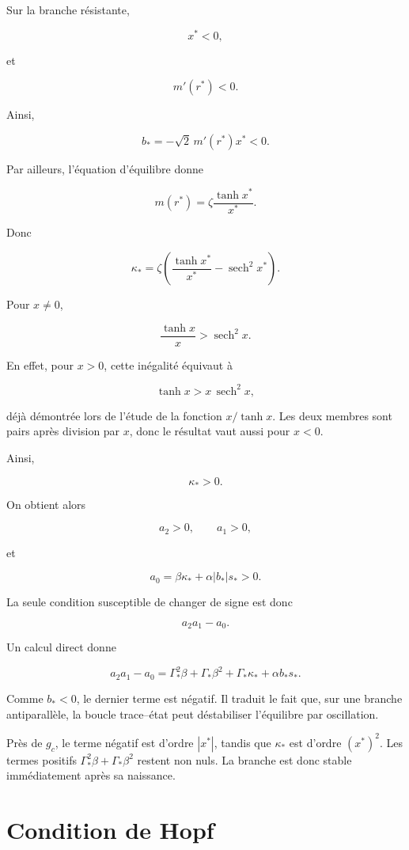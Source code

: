 Sur la branche résistante,

\[
x^\ast<0,
\]

et

\[
m'(r^\ast)<0.
\]

Ainsi,

\[
b_\ast
=
-\sqrt2\,m'(r^\ast)x^\ast
<0.
\]

Par ailleurs, l'équation d'équilibre donne

\[
m(r^\ast)
=
\zeta\frac{\tanh x^\ast}{x^\ast}.
\]

Donc

\[
\kappa_\ast
=
\zeta
\left(
\frac{\tanh x^\ast}{x^\ast}
-
\operatorname{sech}^2x^\ast
\right).
\]

Pour \(x\neq0\),

\[
\frac{\tanh x}{x}
>
\operatorname{sech}^2x.
\]

En effet, pour \(x>0\), cette inégalité équivaut à

\[
\tanh x
>
x\,\operatorname{sech}^2x,
\]

déjà démontrée lors de l'étude de la fonction
\(x/\tanh x\). Les deux membres sont pairs après division par \(x\),
donc le résultat vaut aussi pour \(x<0\).

Ainsi,

\[
\kappa_\ast>0.
\]

On obtient alors

\[
a_2>0,
\qquad
a_1>0,
\]

et

\[
a_0
=
\beta\kappa_\ast
+
\alpha|b_\ast|s_\ast
>0.
\]

La seule condition susceptible de changer de signe est donc

\[
a_2a_1-a_0.
\]

Un calcul direct donne

\[
\boxed{
a_2a_1-a_0
=
\Gamma_\ast^2\beta
+
\Gamma_\ast\beta^2
+
\Gamma_\ast\kappa_\ast
+
\alpha b_\ast s_\ast.
}
\]

Comme \(b_\ast<0\), le dernier terme est négatif. Il traduit le fait
que, sur une branche antiparallèle, la boucle
trace--état peut déstabiliser l'équilibre par oscillation.

Près de \(g_c\), le terme négatif est d'ordre \(|x^\ast|\), tandis que
\(\kappa_\ast\) est d'ordre \((x^\ast)^2\). Les termes positifs
\(\Gamma_\ast^2\beta+\Gamma_\ast\beta^2\) restent non nuls. La branche
est donc stable immédiatement après sa naissance.

\section{Condition de Hopf}
\label{annexe-resistance-hopf-condition}

